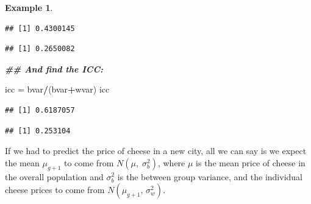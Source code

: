 \documentclass[
  openany]{book}
\newenvironment{Shaded}{\begin{snugshade}}{\end{snugshade}}
\newcommand{\DocumentationTok}[1]{\textcolor[rgb]{0.56,0.35,0.01}{\textbf{\textit{#1}}}}
\newcommand{\FunctionTok}[1]{\textcolor[rgb]{0.13,0.29,0.53}{\textbf{#1}}}
\newcommand{\NormalTok}[1]{#1}
\newcommand{\OtherTok}[1]{\textcolor[rgb]{0.56,0.35,0.01}{#1}}
\newcommand{\SpecialCharTok}[1]{\textcolor[rgb]{0.81,0.36,0.00}{\textbf{#1}}}
\theoremstyle{definition}
\theoremstyle{definition}
\newtheorem{example}{Example}[chapter]
\theoremstyle{definition}
\theoremstyle{definition}
\theoremstyle{remark}
\begin{document}
\begin{example}
\begin{Shaded}
\end{Shaded}

\begin{verbatim}
## [1] 0.4300145
\end{verbatim}

\begin{Shaded}
\end{Shaded}

\begin{verbatim}
## [1] 0.2650082
\end{verbatim}

\begin{Shaded}
\begin{Highlighting}[]
\DocumentationTok{\#\# And find the ICC:}

\NormalTok{icc }\OtherTok{=}\NormalTok{ bvar}\SpecialCharTok{/}\NormalTok{(bvar}\SpecialCharTok{+}\NormalTok{wvar)}
\NormalTok{icc}
\end{Highlighting}
\end{Shaded}

\begin{verbatim}
## [1] 0.6187057
\end{verbatim}

\begin{Shaded}
\end{Shaded}

\begin{verbatim}
## [1] 0.253104
\end{verbatim}

If we had to predict the price of cheese in a new city, all we can say is we expect the mean \(\mu_{g+1}\) to come from \(N\left(\mu,\;\sigma^2_b\right)\), where \(\mu\) is the mean price of cheese in the overall population and \(\sigma^2_b\) is the between group variance, and the individual cheese prices to come from \(N\left(\mu_{g+1},\,\sigma^2_w\right)\).
\end{example}
\end{document}

